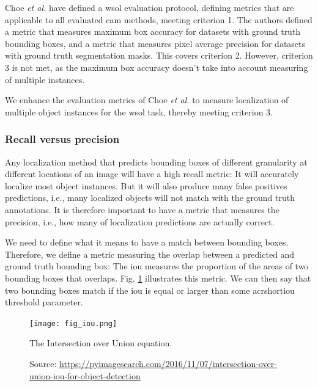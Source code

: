Choe \textit{et al.} \cite{choe2020evaluating} have defined a \acrshort{wsol} evaluation protocol, defining metrics that are applicable to all evaluated \acrshort{cam} methods, meeting criterion 1. The authors defined a metric that measures maximum box accuracy for datasets with ground truth bounding boxes, and a metric that measures pixel average precision for datasets with ground truth segmentation masks. This covers criterion 2. However, criterion 3 is not met, as the maximum box accuracy doesn't take into account measuring of multiple instances.

We enhance the evaluation metrics of Choe \textit{et al.} to measure localization of multiple object instances for the \acrshort{wsol} task, thereby meeting criterion 3.

\subsubsection{Recall versus precision}
Any localization method that predicts bounding boxes of different granularity at different locations of an image will have a high recall metric: It will accurately localize most object instances. But it will also produce many false positives predictions, i.e., many localized objects will not match with the ground truth annotations. It is therefore important to have a metric that measures the precision, i.e., how many of localization predictions are actually correct.

We need to define what it means to have a match between bounding boxes. Therefore, we define a metric measuring the overlap between a predicted and ground truth bounding box: The \acrfull{iou} measures the proportion of the areas of two bounding boxes that overlaps. Fig. \ref{fig:iou} illustrates this metric.  We can then say that two bounding boxes match if the \acrshort{iou} is equal or larger than some acrshort{iou} threshold parameter.

\begin{figure}[ht]
    \begin{center}       
    \texttt{[image: fig\_iou.png]}
    \caption[The IoU equation]{The Intersection over Union equation.}
    \caption*{Source: \href{https://pyimagesearch.com/2016/11/07/intersection-over-union-iou-for-object-detection}{https://pyimagesearch.com/2016/11/07/intersection-over-union-iou-for-object-detection}}
    \label{fig:iou}
    \end{center}
\end{figure}

